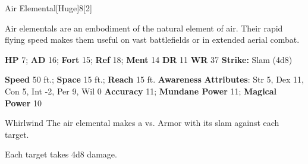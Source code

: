   \begin{monsection}{Air Elemental}[Huge]{8}[2]
    \vspace{-1em}\vspace{-1em}
    \vspace{0em}

    
    Air elementals are an embodiment of the natural element of air.
    Their rapid flying speed makes them useful on vast battlefields or in extended aerial combat.
  

    \begin{spellcontent}
      \begin{spelltargetinginfo}
        \pari \textbf{HP} 7;
          \textbf{AD} 16;
          \textbf{Fort} 15;
          \textbf{Ref} 18;
          \textbf{Ment} 14
        \pari \textbf{DR} 11
        \pari \textbf{WR} 37
        \pari \textbf{Strike:}
            Slam  (4d8)
      \end{spelltargetinginfo}
    \end{spellcontent}
    \begin{monsterfooter}
      \pari \textbf{Speed} 50 ft.;
        \textbf{Space} 15 ft.;
        \textbf{Reach} 15 ft.
      \pari \textbf{Awareness} 
      \pari \textbf{Attributes}:
        Str 5, Dex 11,
        Con 5, Int -2,
        Per 9, Wil 0
      \pari \textbf{Accuracy} 11;
        \textbf{Mundane Power} 11;
      \textbf{Magical Power} 10
    \end{monsterfooter}
  \end{monsection}
  \begin{freeability}{Whirlwind}
       The air elemental makes a 
         vs. Armor
        with its slam against each target.
    
    \hit Each target takes 4d8  damage.
    \end{freeability}
  
